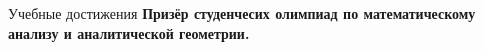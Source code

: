 \begin{rubric}{Учебные достижения}
\entry*[1 семестр] \textbf{Призёр студенчесих олимпиад по математическому анализу и аналитической геометрии.}

\end{rubric}